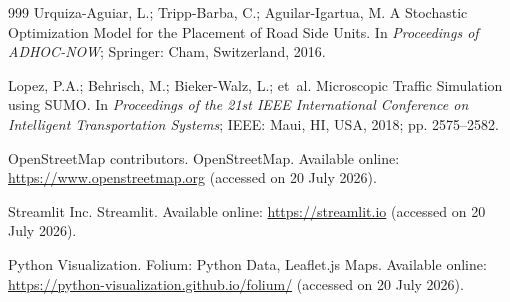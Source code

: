 \documentclass[engproc,proceedingpaper,submit,oneauthor]{Definitions/mdpi}
\newcommand{\todo}[1]{{\color{todored}\textbf{[TO DO: #1]}}}
\begin{document}
	
	\begin{thebibliography}{999}
		Urquiza-Aguiar, L.; Tripp-Barba, C.; Aguilar-Igartua, M. A Stochastic Optimization
		Model for the Placement of Road Side Units. In {\em Proceedings of ADHOC-NOW};
		Springer: Cham, Switzerland, 2016.
		
		Lopez, P.A.; Behrisch, M.; Bieker-Walz, L.; et~al. Microscopic Traffic Simulation
		using SUMO. In {\em Proceedings of the 21st IEEE International Conference on
			Intelligent Transportation Systems}; IEEE: Maui, HI, USA, 2018; pp. 2575--2582.
		
		OpenStreetMap contributors. OpenStreetMap. Available online:
		\url{https://www.openstreetmap.org} (accessed on 20 July 2026).
		
		Streamlit Inc. Streamlit. Available online: \url{https://streamlit.io} (accessed on
		20 July 2026).
		
		Python Visualization. Folium: Python Data, Leaflet.js Maps. Available online:
		\url{https://python-visualization.github.io/folium/} (accessed on 20 July 2026).
	\end{thebibliography}
	
	\PublishersNote{}
\end{document}
